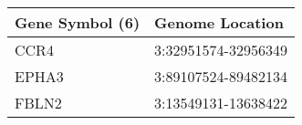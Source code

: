 \begin{tabular}{ll}
\toprule
Gene Symbol (6) &     Genome Location \\
\midrule
           CCR4 & 3:32951574-32956349 \\
          EPHA3 & 3:89107524-89482134 \\
          FBLN2 & 3:13549131-13638422 \\
\bottomrule
\end{tabular}
